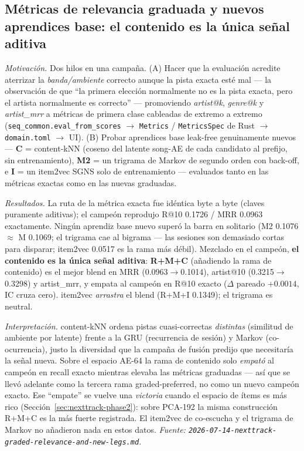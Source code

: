\documentclass[11pt]{article}
\begin{document}
\subsection{Métricas de relevancia graduada y nuevos aprendices base: el contenido es la única señal aditiva}
\label{sec:nexttrack-graded}
\emph{Motivación.} Dos hilos en una campaña. (A) Hacer que la evaluación acredite
aterrizar la \emph{banda/ambiente} correcto aunque la pista exacta esté mal --- la
observación de que ``la primera elección normalmente no es la pista exacta, pero el
artista normalmente es correcto'' --- promoviendo \emph{artist@k}, \emph{genre@k} y
\emph{artist\_mrr} a métricas de primera clase cableadas de extremo a extremo
(\texttt{seq\_common.eval\_from\_scores} $\to$ \texttt{Metrics} /
\texttt{MetricsSpec} de Rust $\to$ \texttt{domain.toml} $\to$ UI). (B) Probar
aprendices base leak-free genuinamente nuevos --- \textbf{C} = content-kNN (coseno
del latente song-AE de cada candidato al prefijo, sin entrenamiento), \textbf{M2} =
un trigrama de Markov de segundo orden con back-off, e \textbf{I} = un item2vec
SGNS solo de entrenamiento --- evaluados tanto en las métricas exactas como en las
nuevas graduadas.

\emph{Resultados.} La ruta de la métrica exacta fue idéntica byte a byte (claves
puramente aditivas); el campeón reprodujo R@10 \num{0.1726} / MRR \num{0.0963}
exactamente. Ningún aprendiz base nuevo superó la barra en solitario (M2
\num{0.1076} $\approx$ M \num{0.1069}; el trigrama cae al bigrama --- las sesiones
son demasiado cortas para disparar; item2vec \num{0.0517} es la rama más débil).
Mezclado en el campeón, \textbf{el contenido es la única señal aditiva}:
\textbf{R+M+C} (añadiendo la rama de contenido) es el mejor blend en MRR
(\num{0.0963}$\to$\num{0.1014}), artist@10 (\num{0.3215}$\to$\num{0.3298}) y
artist\_mrr, y empata al campeón en R@10 exacto ($\Delta$ pareado $+\num{0.0014}$,
IC cruza cero). item2vec \emph{arrastra} el blend (R+M+I \num{0.1349}); el trigrama
es neutral.

\emph{Interpretación.} content-kNN ordena pistas cuasi-correctas \emph{distintas}
(similitud de ambiente por latente) frente a la GRU (recurrencia de sesión) y
Markov (co-ocurrencia), justo la diversidad que la campaña de fusión predijo que
necesitaría la señal nueva. Sobre el espacio AE-64 la rama de contenido solo
\emph{empató} al campeón en recall exacto mientras elevaba las métricas graduadas
--- así que se llevó adelante como la tercera rama graded-preferred, no como un
nuevo campeón exacto. Ese ``empate'' se vuelve una \emph{victoria} cuando el
espacio de ítems es más rico (Sección~\ref{sec:nexttrack-phase2}): sobre PCA-192 la
misma construcción R+M+C es la más fuerte registrada. El item2vec de co-escucha y
el trigrama de Markov no añadieron nada en estos datos.
\emph{Fuente: \texttt{2026-07-14-nexttrack-graded-relevance-and-new-legs.md}.}
\end{document}

